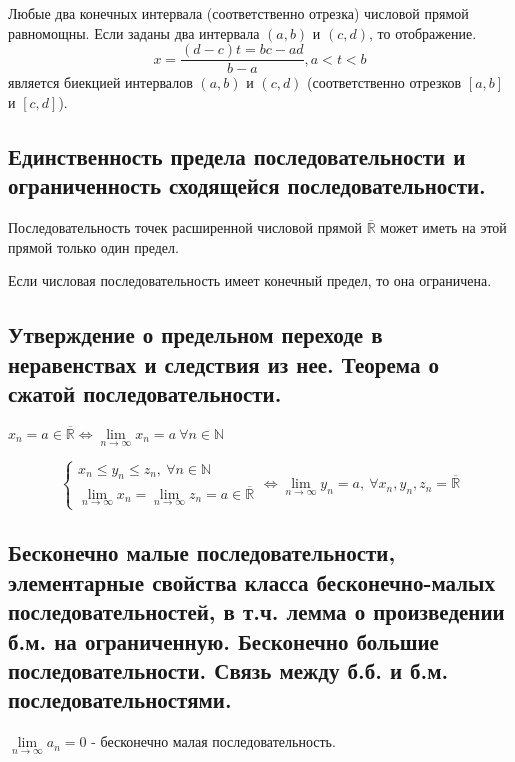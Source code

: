 \documentclass{article}
\begin{document}
  Любые два конечных интервала (соответственно отрезка) числовой прямой равномощны. Если заданы два интервала $(a,b)$ и $(c,d)$, то отображение.
\begin{equation*}
		x = \frac{(d - c)t = bc - ad}{b - a}, a < t < b
\end{equation*}
является биекцией интервалов $(a,b)$ и $(c,d)$ (соответственно отрезков $[a,b]$ и $[c,d]$).

\subsection{Единственность предела последовательности и ограниченность сходящейся последовательности.}
 Последовательность точек расширенной числовой прямой $\overline{\mathbb{R}}$ может иметь на этой прямой только один предел.

 Если числовая последовательность имеет конечный предел, то она ограничена.

\subsection{Утверждение о предельном переходе в неравенствах и следствия из нее. Теорема о сжатой последовательности.}
 $x_n = a \in \overline{\mathbb{R}} \Leftrightarrow \lim\limits_{n \to \infty}x_n = a\  \forall n \in \mathbb{N}$

\begin{equation*}
	\begin{cases}
		x_n \leq y_n \leq z_n,\ \forall n \in \mathbb{N} \\
		\lim\limits_{n \to \infty}x_n = \lim\limits_{n \to \infty}z_n = a \in \overline{\mathbb{R}}
	\end{cases}
	\Leftrightarrow \lim\limits_{n \to \infty}y_n = a,\ \forall x_n, y_n, z_n = \overline{\mathbb{R}}
\end{equation*}

\subsection{Бесконечно малые последовательности, элементарные свойства класса бесконечно-малых последовательностей, в т.ч. лемма о произведении б.м. на ограниченную. Бесконечно большие последовательности. Связь между б.б. и б.м. последовательностями.}
 $\lim\limits_{n \to \infty}a_n = 0$ - бесконечно малая последовательность.
\end{document}
